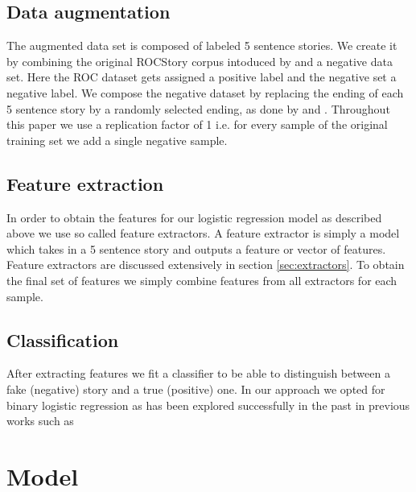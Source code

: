 \documentclass{article}
\begin{document}
\subsection{Data augmentation}
\label{sec:augmentation}
The augmented data set is composed of labeled 5 sentence stories. We create it by combining the original ROCStory corpus intoduced by \cite{ROCstories} and a negative data set. Here the ROC dataset gets assigned a positive label and the negative set a negative label. We compose the negative dataset by replacing the ending of each 5 sentence story by a randomly selected ending, as done by \cite{LSTMClassifier} and \cite{SENTENCE_EMB}. Throughout this paper we use a replication factor of 1 i.e. for every sample of the original training set we add a single negative sample.

\subsection{Feature extraction}
\label{sec:extraction}
In order to obtain the features for our logistic regression model as described above we use so called feature extractors. A feature extractor is simply a model which takes in a 5 sentence story and outputs a feature or vector of features. Feature extractors are discussed extensively in section \ref{sec:extractors}. To obtain the final set of features we simply combine features from all extractors for each sample.

\subsection{Classification}
\label{sec:classifier}
After extracting features we fit a classifier to be able to distinguish between a fake (negative) story and a true (positive) one. In our approach we opted for binary logistic regression as has been explored successfully in the past in previous works such as \cite{UWNLP,Goel,COGCOMP}

\section{Model}
\end{document}

